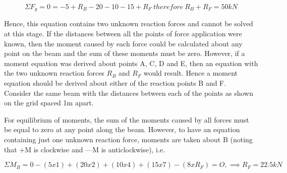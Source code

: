 \documentclass[12pt, letterpaper, twoside]{article}
\begin{document}
\begin{equation}
\Sigma F_y = 0 = -5 + R_B -20 - 10 - 15 + R_F \ therefore \ R_B + R_F = 50kN
\end{equation}


\bigskip

Hence, this equation contains two unknown reaction forces and cannot be solved at this stage.
If the distances between all the points of force application were known, then the moment caused by each force could be calculated about any point on the beam and the sum of these moments must be zero. However, if a moment equation was derived about points A, C, D and E, then an equation with the two unknown reaction forces $R_B$ and $R_F$ would result. Hence a moment equation should be derived about either of the reaction points B and F.\\
Consider the same beam with the distances between each of the points as shown on the grid spaced 1m apart.

\begin{center}
\end{center}

\bigskip

For equilibrium of moments, the sum of the moments caused by all forces must be equal to zero at any point along the beam. However, to have an equation containing just one unknown reaction force, moments are taken about B (noting that +M is clockwise and —M is anticlockwise), i.e.

\begin{equation}
\Sigma M_B = 0 -(5x1) + (20x2) + (10x4) + (15x7) - (8xR_F) = O, \implies	R_F = 22.5 kN
\end{equation}
\end{document}
